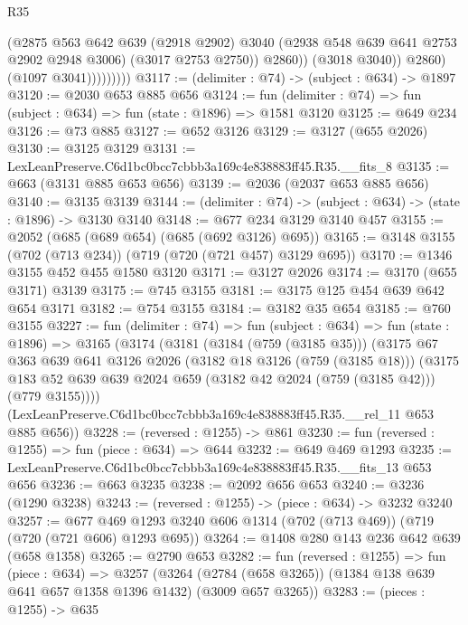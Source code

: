 \begin{lexlean}{R35}
\begin{coremodule}
                            (@2875
                              @563
                              @642
                              @639
                              (@2918 @2902)
                              @3040
                              (@2938 @548 @639 @641 @2753 @2902 @2948 @3006)
                              (@3017 @2753 @2750))
                            @2860))
                        (@3018 @3040))
                      @2860)
                    (@1097 @3041)))))))))
@3117 := (delimiter : @74) -> (subject : @634) -> @1897
@3120 := @2030 @653 @885 @656
@3124 := fun (delimiter : @74) => fun (subject : @634) => fun (state : @1896) => @1581 @3120
@3125 := @649 @234
@3126 := @73 @885
@3127 := @652 @3126
@3129 := @3127 (@655 @2026)
@3130 := @3125 @3129
@3131 := LexLeanPreserve.C6d1bc0bcc7cbbb3a169c4e838883ff45.R35.__fits_8
@3135 := @663 (@3131 @885 @653 @656)
@3139 := @2036 (@2037 @653 @885 @656)
@3140 := @3135 @3139
@3144 := (delimiter : @74) -> (subject : @634) -> (state : @1896) -> @3130 @3140
@3148 := @677 @234 @3129 @3140 @457
@3155 := @2052 (@685 (@689 @654) (@685 (@692 @3126) @695))
@3165 := @3148 @3155 (@702 (@713 @234)) (@719 (@720 (@721 @457) @3129 @695))
@3170 := @1346 @3155 @452 @455 @1580 @3120
@3171 := @3127 @2026
@3174 := @3170 (@655 @3171) @3139
@3175 := @745 @3155
@3181 := @3175 @125 @454 @639 @642 @654 @3171
@3182 := @754 @3155
@3184 := @3182 @35 @654
@3185 := @760 @3155
@3227 := fun (delimiter : @74) =>
  fun (subject : @634) =>
  fun (state : @1896) =>
  @3165
    (@3174
      (@3181
        (@3184 (@759 (@3185 @35)))
        (@3175
          @67
          @363
          @639
          @641
          @3126
          @2026
          (@3182 @18 @3126 (@759 (@3185 @18)))
          (@3175 @183 @52 @639 @639 @2024 @659 (@3182 @42 @2024 (@759 (@3185 @42))) (@779 @3155))))
      (LexLeanPreserve.C6d1bc0bcc7cbbb3a169c4e838883ff45.R35.__rel_11 @653 @885 @656))
@3228 := (reversed : @1255) -> @861
@3230 := fun (reversed : @1255) => fun (piece : @634) => @644
@3232 := @649 @469 @1293
@3235 := LexLeanPreserve.C6d1bc0bcc7cbbb3a169c4e838883ff45.R35.__fits_13 @653 @656
@3236 := @663 @3235
@3238 := @2092 @656 @653
@3240 := @3236 (@1290 @3238)
@3243 := (reversed : @1255) -> (piece : @634) -> @3232 @3240
@3257 := @677 @469 @1293 @3240 @606 @1314 (@702 (@713 @469)) (@719 (@720 (@721 @606) @1293 @695))
@3264 := @1408 @280 @143 @236 @642 @639 (@658 @1358)
@3265 := @2790 @653
@3282 := fun (reversed : @1255) =>
  fun (piece : @634) =>
  @3257
    (@3264 (@2784 (@658 @3265)) (@1384 @138 @639 @641 @657 @1358 @1396 @1432) (@3009 @657 @3265))
@3283 := (pieces : @1255) -> @635

\end{coremodule}
\end{lexlean}

